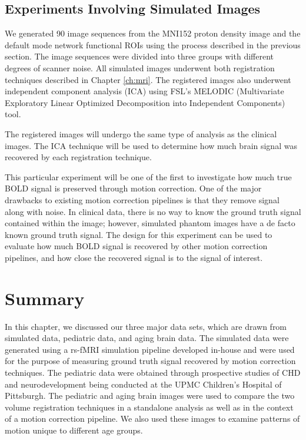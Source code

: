 \subsection{Experiments Involving Simulated Images}

We generated 90 image sequences from the MNI152 proton density image and the default mode network functional ROIs using the process described in the previous section. The image sequences were divided into three groups with different degrees of scanner noise. All simulated images underwent both registration techniques described in Chapter \ref{ch:mri}. The registered images also underwent independent component analysis (ICA) using FSL's MELODIC (Multivariate Exploratory Linear Optimized Decomposition into Independent Components) tool. %

The registered images will undergo the same type of analysis as the clinical images. The ICA technique will be used to determine how much brain signal was recovered by each registration technique.

This particular experiment will be one of the first to investigate how much true BOLD signal is preserved through motion correction. One of the major drawbacks to existing motion correction pipelines is that they remove signal along with noise. In clinical data, there is no way to know the ground truth signal contained within the image; however, simulated phantom images have a de facto known ground truth signal. The design for this experiment can be used to evaluate how much BOLD signal is recovered by other motion correction pipelines, and how close the recovered signal is to the signal of interest.

\section{Summary}

In this chapter, we discussed our three major data sets, which are drawn from simulated data, pediatric data, and aging brain data. The simulated data were generated using a rs-fMRI simulation pipeline developed in-house and were used for the purpose of measuring ground truth signal recovered by motion correction techniques. The pediatric data were obtained through prospective studies of CHD and neurodevelopment being conducted at the UPMC Children's Hospital of Pittsburgh. The pediatric and aging brain images were used to compare the two volume registration techniques in a standalone analysis as well as in the context of a motion correction pipeline. We also used these images to examine patterns of motion unique to different age groups. 